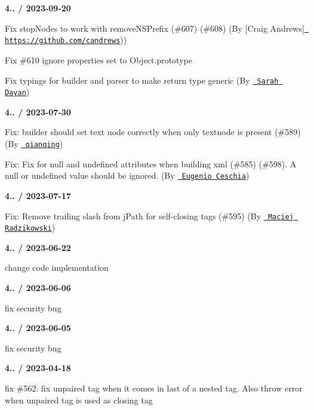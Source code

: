 {\bfseries{4.. / 2023-\/09-\/20}}
\begin{DoxyItemize}
\item Fix stop\+Nodes to work with remove\+NSPrefix (\#607) (\#608) (By \mbox{[}Craig Andrews\mbox{]}\href{https://github.com/candrews}{\texttt{ https\+://github.\+com/candrews}}))
\item Fix \#610 ignore properties set to Object.\+prototype
\item Fix typings for builder and parser to make return type generic (By \href{https://github.com/sarahdayan}{\texttt{ Sarah Dayan}})
\end{DoxyItemize}

{\bfseries{4.. / 2023-\/07-\/30}}
\begin{DoxyItemize}
\item Fix\+: builder should set text node correctly when only textnode is present (\#589) (By \href{https://github.com/joneqian}{\texttt{ qianqing}})
\item Fix\+: Fix for null and undefined attributes when building xml (\#585) (\#598). A null or undefined value should be ignored. (By \href{https://github.com/cecia234}{\texttt{ Eugenio Ceschia}})
\end{DoxyItemize}

{\bfseries{4.. / 2023-\/07-\/17}}
\begin{DoxyItemize}
\item Fix\+: Remove trailing slash from j\+Path for self-\/closing tags (\#595) (By \href{https://github.com/m-radzikowski}{\texttt{ Maciej Radzikowski}})
\end{DoxyItemize}

{\bfseries{4.. / 2023-\/06-\/22}}
\begin{DoxyItemize}
\item change code implementation
\end{DoxyItemize}

{\bfseries{4.. / 2023-\/06-\/06}}
\begin{DoxyItemize}
\item fix security bug
\end{DoxyItemize}

{\bfseries{4.. / 2023-\/06-\/05}}
\begin{DoxyItemize}
\item fix security bug
\end{DoxyItemize}

{\bfseries{4.. / 2023-\/04-\/18}}
\begin{DoxyItemize}
\item fix \#562\+: fix unpaired tag when it comes in last of a nested tag. Also throw error when unpaired tag is used as closing tag
\end{DoxyItemize}

